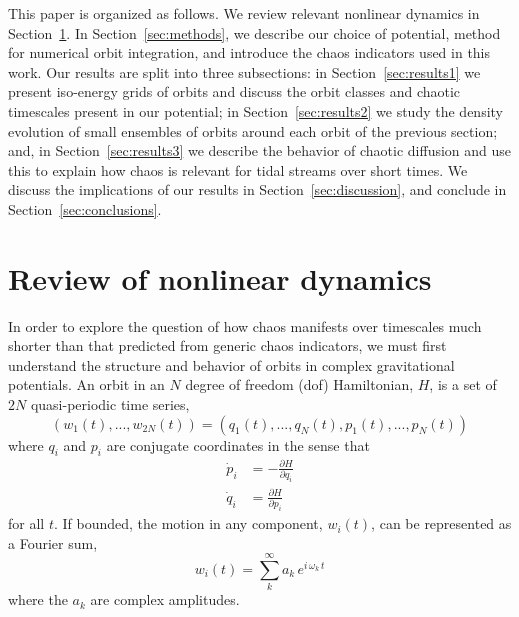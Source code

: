 \documentclass[letterpaper,12pt,preprint]{aastex}
\begin{document}
This paper is organized as follows. We review relevant nonlinear dynamics in Section~\ref{sec:nldreview}. In Section~\ref{sec:methods}, we describe our choice of potential, method for numerical orbit integration, and introduce the chaos indicators used in this work. Our results are split into three subsections: in Section~\ref{sec:results1} we present iso-energy grids of orbits and discuss the orbit classes and chaotic timescales present in our potential; in Section~\ref{sec:results2} we study the density evolution of small ensembles of orbits around each orbit of the previous section; and, in Section~\ref{sec:results3} we describe the behavior of chaotic diffusion and use this to explain how chaos is relevant for tidal streams over short times. We discuss the implications of our results in Section~\ref{sec:discussion}, and conclude in Section~\ref{sec:conclusions}.

\section{Review of nonlinear dynamics}\label{sec:nldreview}

In order to explore the question of how chaos manifests over timescales much shorter than that predicted from generic chaos indicators, we must first understand the structure and behavior of orbits in complex gravitational potentials. An orbit in an $N$ degree of freedom (dof) Hamiltonian, $H$, is a set of $2N$ quasi-periodic time series, 
\begin{equation}
(w_1(t),...,w_{2N}(t)) = (q_1(t),...,q_{N}(t),p_1(t),...,p_{N}(t)) \label{eq:coords}
\end{equation}
where $q_i$ and $p_i$ are conjugate coordinates in the sense that
\begin{align}
	\dot{p}_i &= -\frac{\partial H}{\partial q_i}\\
	\dot{q}_i &= \frac{\partial H}{\partial p_i}
\end{align}
for all $t$. If bounded, the motion in any component, $w_i(t)$, can be represented as a Fourier sum,
\begin{equation}
	w_i(t) = \sum_k^\infty a_k \, e^{i\,\omega_k\,t} \label{eq:fourier}
\end{equation}
where the $a_k$ are complex amplitudes.
\end{document}
